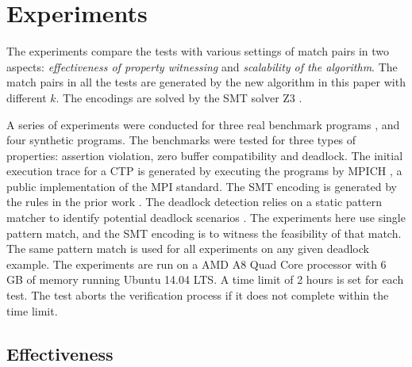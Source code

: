 \section{Experiments}
The experiments compare the tests with various settings of match pairs in two aspects: \textit{effectiveness of property witnessing} and \textit{scalability of the algorithm}.
The match pairs in all the tests are generated by the new algorithm in this paper with different $k$. 
The encodings are solved by the SMT solver Z3 \cite{demoura:tacas08}. 

A series of experiments were conducted for three real benchmark programs \cite{benchmark:fevs,mpptest_benchmark,DBLP:conf/ppopp/XueLWGCZZV09}, and four synthetic programs. 
The benchmarks were tested for three types of properties: assertion violation, zero buffer compatibility and deadlock. 
The initial execution trace for a CTP is generated by executing the programs by MPICH \cite{mpich}, a public implementation of the MPI standard. The SMT encoding is generated by the rules in the prior work \cite{DBLP:conf/kbse/HuangMM13,HuangNFM15}. The deadlock detection relies on a static pattern matcher to identify potential deadlock scenarios \cite{}. The experiments here use single pattern match, and the SMT encoding is to witness the feasibility of that match. The same pattern match is used for all experiments on any given deadlock example. 
The experiments are run on a AMD A8 Quad Core processor with 6 GB of memory running Ubuntu 14.04 LTS. A time limit of 2 hours is set for each test. The test aborts the verification process if it does not complete within the time limit.

\subsection{Effectiveness}


